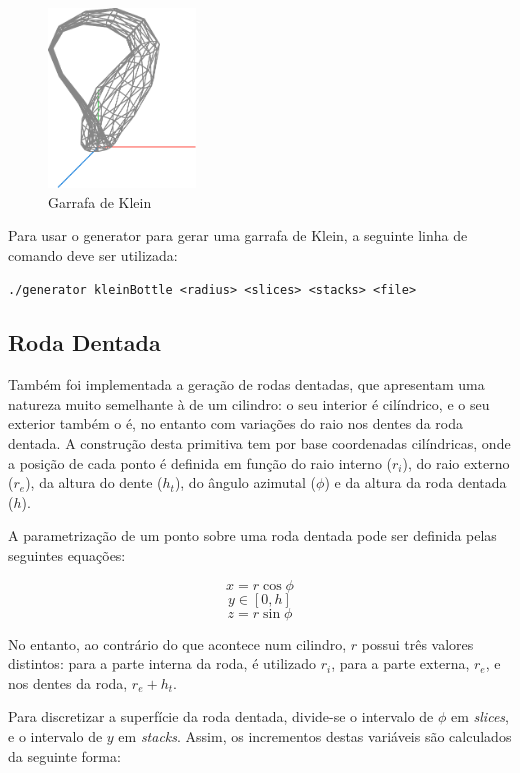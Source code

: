 \documentclass[12pt, a4paper]{article}
\begin{document}
\begin{figure}[H]
    \centering
    \includegraphics[width=0.35\textwidth]{res/phase2/figures/kleinBottle.pdf}
    \caption{Garrafa de Klein}
\end{figure}

Para usar o generator para gerar uma garrafa de Klein, a seguinte linha de comando deve ser
utilizada:

\begin{center}
    \texttt{./generator kleinBottle <radius> <slices> <stacks> <file>}
\end{center}

\subsection{Roda Dentada}

Também foi implementada a geração de rodas dentadas, que apresentam uma natureza muito semelhante à
de um cilindro: o seu interior é cilíndrico, e o seu exterior também o é, no entanto com variações
do raio nos dentes da roda dentada. A construção desta primitiva tem por base coordenadas
cilíndricas, onde a posição de cada ponto é definida em função do raio interno ($r_i$), do raio
externo ($r_e$), da altura do dente ($h_t$), do ângulo azimutal ($\phi$) e da altura da roda dentada
($h$).

A parametrização de um ponto sobre uma roda dentada pode ser definida pelas seguintes equações:

$$x = r \cos \phi$$
$$y \in \left [ 0, h \right ]$$
$$z =  r \sin \phi$$

No entanto, ao contrário do que acontece num cilindro, $r$ possui três valores distintos: para a
parte interna da roda, é utilizado $r_i$, para a parte externa, $r_e$, e nos dentes da roda,
$r_e + h_t$.

Para discretizar a superfície da roda dentada, divide-se o intervalo de $\phi$ em \emph{slices}, e
o intervalo de $y$ em \emph{stacks}. Assim, os incrementos destas variáveis são calculados da
seguinte forma:
\end{document}
